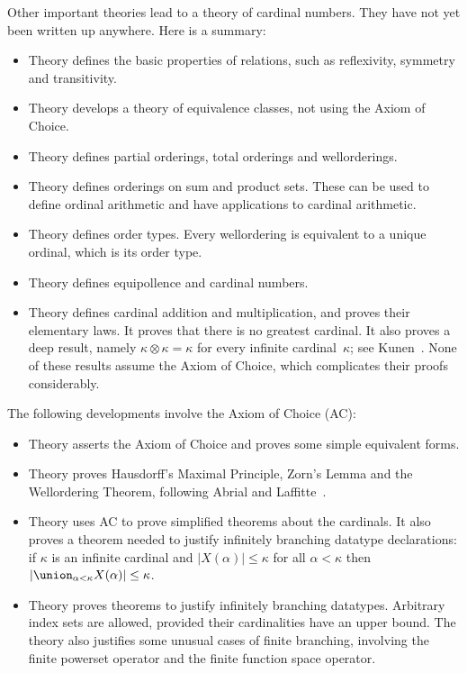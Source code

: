 Other important theories lead to a theory of cardinal numbers.  They have
not yet been written up anywhere.  Here is a summary:
\begin{itemize}
\item Theory  defines the basic properties of relations, such as
  reflexivity, symmetry and transitivity.

\item Theory  develops a theory of equivalence
  classes, not using the Axiom of Choice.

\item Theory  defines partial orderings, total orderings and
  wellorderings.

\item Theory  defines orderings on sum and product sets.
  These can be used to define ordinal arithmetic and have applications to
  cardinal arithmetic.

\item Theory  defines order types.  Every wellordering is
  equivalent to a unique ordinal, which is its order type.

\item Theory  defines equipollence and cardinal numbers.
 
\item Theory  defines cardinal addition and
  multiplication, and proves their elementary laws.  It proves that there
  is no greatest cardinal.  It also proves a deep result, namely
  $\kappa\otimes\kappa=\kappa$ for every infinite cardinal~$\kappa$; see
  Kunen~\cite[page 29]{kunen80}.  None of these results assume the Axiom of
  Choice, which complicates their proofs considerably.  
\end{itemize}

The following developments involve the Axiom of Choice (AC):
\begin{itemize}
\item Theory  asserts the Axiom of Choice and proves some simple
  equivalent forms.

\item Theory  proves Hausdorff's Maximal Principle, Zorn's Lemma
  and the Wellordering Theorem, following Abrial and
  Laffitte~\cite{abrial93}.

\item Theory  uses AC to prove simplified theorems about
  the cardinals.  It also proves a theorem needed to justify
  infinitely branching datatype declarations: if $\kappa$ is an infinite
  cardinal and $|X(\alpha)| \le \kappa$ for all $\alpha<\kappa$ then
  $|\union\sb{\alpha<\kappa} X(\alpha)| \le \kappa$.

\item Theory  proves theorems to justify infinitely
  branching datatypes.  Arbitrary index sets are allowed, provided their
  cardinalities have an upper bound.  The theory also justifies some
  unusual cases of finite branching, involving the finite powerset operator
  and the finite function space operator.
\end{itemize}



